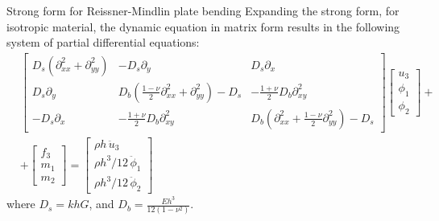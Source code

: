\documentclass[aspectratio=169]{beamer}
\begin{document}
\begin{frame}{Strong form for Reissner-Mindlin plate bending}
  Expanding the strong form, for isotropic material, the dynamic equation in matrix form results in the following system of partial differential equations:
  \begin{align*}
     & \left[
      \begin{array}{ccc}
        D_s \left( \partial^2_{xx} +\partial^2_{yy}  \right) & -D_s\partial_{y}                                                             & D_s\partial_{x}                                                              \\[5pt]
        D_s \partial_{y}                                     & D_b \left( \frac{1 - \nu}{2} \partial^2_{xx}  +\partial^2_{yy} \right) - D_s & -\frac{1 + \nu}{2} D_b \partial^2_{xy}                                       \\[5pt]
        -D_s\partial_{x}                                     & -\frac{1 + \nu}{2} D_b \partial^2_{xy}                                       & D_b \left(\partial^2_{xx} + \frac{1 - \nu}{2} \partial^2_{yy}  \right) - D_s
      \end{array}
      \right]
    \left[
      \begin{array}{c}
        u_3    \\[5pt]
        \phi_1 \\[5pt]
        \phi_2
      \end{array}
      \right]
    +         \\
     & +
    \left[
      \begin{array}{c}
        f_3 \\
        m_1 \\
        m_2
      \end{array}
      \right]
    =
    \left[
      \begin{array}{c}
        \rho h\, \ddot{u}_3         \\
        \rho h^3/12\, \ddot{\phi}_1 \\
        \rho h^3/12\, \ddot{\phi}_2
      \end{array}
      \right]
  \end{align*}
  where $D_s=khG$, and $D_b=\frac{Eh^3}{12(1-\nu^2)}$.
\end{frame}
\end{document}

